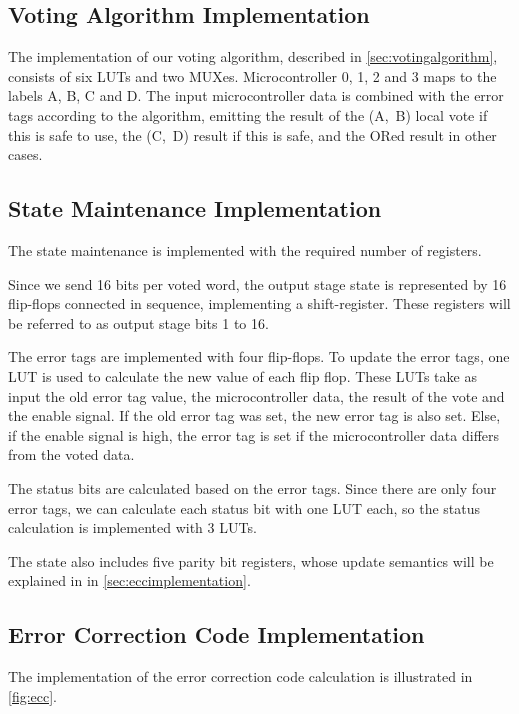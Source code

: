 \subsection{Voting Algorithm Implementation}
The implementation of our voting algorithm, described in
\autoref{sec:votingalgorithm}, consists of six LUTs and two
MUXes. Microcontroller 0, 1, 2 and 3 maps to the labels A, B, C and
D. The input microcontroller data is combined with the error tags
according to the algorithm, emitting the result of the (A,~B) local
vote if this is safe to use, the (C,~D) result if this is safe, and
the ORed result in other cases. 


\subsection{State Maintenance Implementation}
The state maintenance is implemented with the required number of
registers. 

Since we send 16 bits per voted word, the output stage state is
represented by 16 flip-flops connected in sequence, implementing a
shift-register. These registers will be referred to as output stage
bits 1 to 16. 

The error tags are implemented with four flip-flops. To update the
error tags, one LUT is used to calculate the new value of each flip
flop. These LUTs take as input the old error tag value, the
microcontroller data, the result of the vote and the enable signal. If
the old error tag was set, the new error tag is also set. Else, if the
enable signal is high, the error tag is set if the microcontroller
data differs from the voted data.

The status bits are calculated based on the error tags. Since there
are only four error tags, we can calculate each status bit with one
LUT each, so the status calculation is implemented with 3 LUTs. 

The state also includes five parity bit registers, whose update
semantics will be explained in in \autoref{sec:eccimplementation}.

\subsection{Error Correction Code Implementation}
\label{sec:eccimplementation}
The implementation of the error correction code calculation is
illustrated in \autoref{fig:ecc}. 

